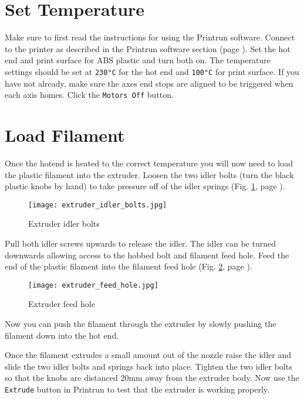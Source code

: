\section{Set Temperature}
Make sure to first read the instructions for using the Printrun software. Connect to the printer as described in the Printrun software section
(page \pageref{Printrun}). Set the hot end and print surface for ABS plastic and turn both on. The temperature settings should be set at \texttt{230°C} for the hot end and \texttt{100°C} for print surface. If you have not already, make sure the axes end stops are aligned to be triggered when each axis homes. Click the \texttt{Motors Off} button.

\section{Load Filament}
Once the hotend is heated to the correct temperature you will now need to load the plastic filament into the extruder. Loosen the two idler bolts (turn the black plastic knobs by hand) to take pressure off of the idler springs
(Fig. \ref{fig:extruder_idler_bolts}, page \pageref{fig:extruder_idler_bolts}).
\begin{figure}[hbt]
\centering
\texttt{[image: extruder\_idler\_bolts.jpg]}
\caption{Extruder idler bolts}
\label{fig:extruder_idler_bolts}
\end{figure}
Pull both idler screws upwards to release the idler. The idler can be turned downwards allowing access to the hobbed bolt and filament feed hole. Feed the end of the plastic filament into the filament feed hole
(Fig. \ref{fig:extruder_feed_hole}, page \pageref{fig:extruder_feed_hole}).
\begin{figure}[hbt]
\centering
\texttt{[image: extruder\_feed\_hole.jpg]}
\caption{Extruder feed hole}
\label{fig:extruder_feed_hole}
\end{figure}
Now you can push the filament through the extruder by slowly pushing the filament down into the hot end.

Once the filament extrudes a small amount out of the nozzle raise the idler and slide the two idler bolts and springs back into place. Tighten the two idler bolts so that the knobs are distanced 20mm away from the extruder body. Now use the \texttt{Extrude} button in Printrun to test that the extruder is working properly.


